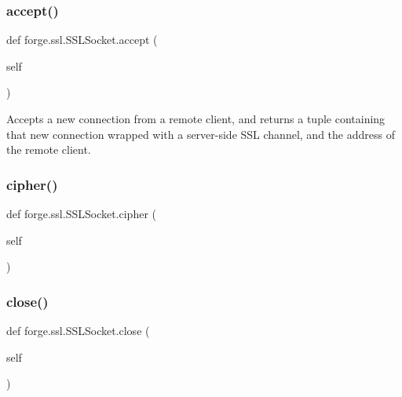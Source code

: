 \subsubsection{\texorpdfstring{accept()}{accept()}}
{\footnotesize\ttfamily def forge.\+ssl.\+S\+S\+L\+Socket.\+accept (\begin{DoxyParamCaption}\item[{}]{self }\end{DoxyParamCaption})}

\begin{DoxyVerb}Accepts a new connection from a remote client, and returns
a tuple containing that new connection wrapped with a server-side
SSL channel, and the address of the remote client.\end{DoxyVerb}
 \mbox{\label{classforge_1_1ssl_1_1_s_s_l_socket_acb49d5aa36898812e7e9d58ced6227d8}} 
\subsubsection{\texorpdfstring{cipher()}{cipher()}}
{\footnotesize\ttfamily def forge.\+ssl.\+S\+S\+L\+Socket.\+cipher (\begin{DoxyParamCaption}\item[{}]{self }\end{DoxyParamCaption})}

\mbox{\label{classforge_1_1ssl_1_1_s_s_l_socket_a0931f143205a960d3f037491cea25513}} 
\subsubsection{\texorpdfstring{close()}{close()}}
{\footnotesize\ttfamily def forge.\+ssl.\+S\+S\+L\+Socket.\+close (\begin{DoxyParamCaption}\item[{}]{self }\end{DoxyParamCaption})}

\mbox{\label{classforge_1_1ssl_1_1_s_s_l_socket_ad376e228d79f3f27d01436cc252e2bbf}} 
